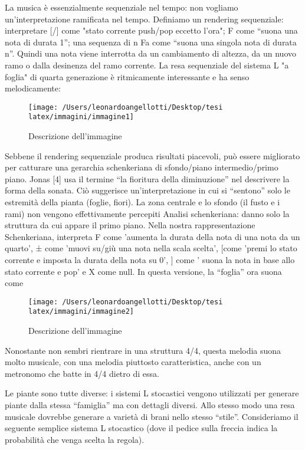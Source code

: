 \documentclass[a4paper,12pt]{report}
\begin{document}
La musica è essenzialmente sequenziale nel tempo: non vogliamo un'interpretazione ramificata nel tempo. 
Definiamo un rendering sequenziale: interpretare [/] come "stato corrente push/pop eccetto l'ora"; 
F come “suona una nota di durata 1”; 
una sequenza di n Fa come “suona una singola nota di durata n”. 
Quindi una nota viene interrotta da un cambiamento di altezza, da un nuovo ramo o dalla desinenza del ramo corrente. 
La resa sequenziale del sistema L "a foglia" di quarta generazione è ritmicamente interessante e ha senso melodicamente:

\begin{figure}[h!]
    \centering
    \texttt{[image: /Users/leonardoangellotti/Desktop/tesi latex/immagini/immagine1]} %
    \caption{Descrizione dell'immagine}
    \label{fig:immagine}
\end{figure}

Sebbene il rendering sequenziale produca risultati piacevoli, può essere migliorato per catturare una gerarchia schenkeriana di sfondo/piano intermedio/primo piano. 
Jonas [4] usa il termine “la fioritura della diminuzione” nel descrivere la forma della sonata. 
Ciò suggerisce un'interpretazione in cui si “sentono” solo le estremità della pianta (foglie, fiori). La zona centrale e lo sfondo (il fusto e i rami) non vengono effettivamente percepiti
Analisi schenkeriana: danno solo la struttura da cui appare il primo piano.
Nella nostra rappresentazione Schenkeriana, interpreta F come 'aumenta la durata della nota di una nota da un quarto', ± come 'muovi su/giù una nota nella scala scelta', [come 'premi lo stato corrente e imposta la durata della nota su 0', ] come ' suona la nota in base allo stato corrente e pop' e X come null.
In questa versione, la “foglia” ora suona come

\begin{figure}[h!]
    \centering
    \texttt{[image: /Users/leonardoangellotti/Desktop/tesi latex/immagini/immagine2]} %
    \caption{Descrizione dell'immagine}
    \label{fig:immagine}
\end{figure}

Nonostante non sembri rientrare in una struttura 4/4, questa melodia suona molto musicale, con una melodia piuttosto caratteristica, anche con un metronomo che batte in 4/4 dietro di essa.

Le piante sono tutte diverse: i sistemi L stocastici vengono utilizzati per generare piante dalla stessa
“famiglia” ma con dettagli diversi. Allo stesso modo una resa musicale dovrebbe generare a
varietà di brani nello stesso “stile”. Consideriamo il seguente semplice sistema L stocastico
(dove il pedice sulla freccia indica la probabilità che venga scelta la regola).
\end{document}
